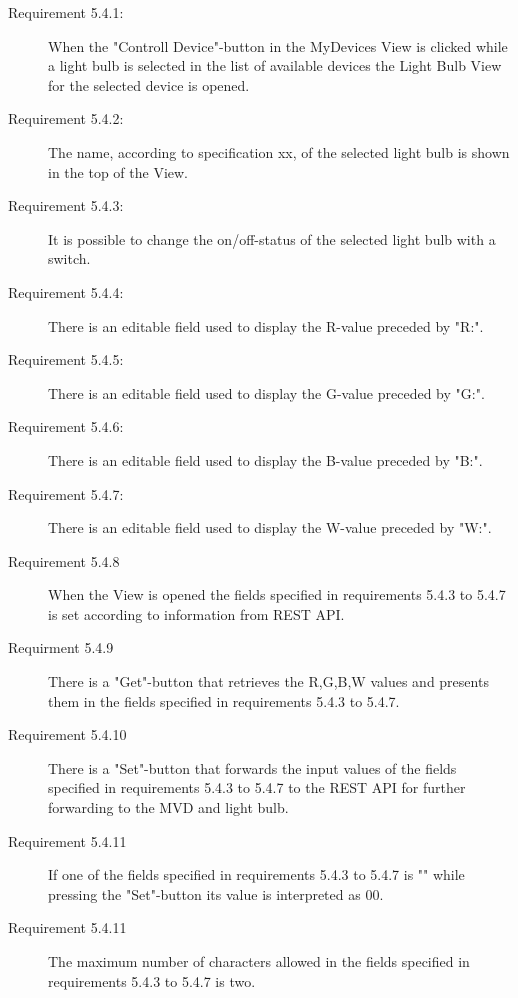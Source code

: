 \documentclass[a4paper]{article}
\begin{document}
\begin{description}
\item[Requirement 5.4.1:] When the "Controll Device"-button in the MyDevices View is clicked while a light bulb is selected in the list of available devices the Light Bulb View for the selected device is opened. 

\item[Requirement 5.4.2:] The name, according to specification xx, of the selected light bulb is shown in the top of the View.

\item[Requirement 5.4.3:] It is possible to change the on/off-status of the selected light bulb with a switch.

\item[Requirement 5.4.4:] There is an editable field used to display the R-value preceded by "R:".

\item[Requirement 5.4.5:] There is an editable field used to display the G-value preceded by "G:".

\item[Requirement 5.4.6:] There is an editable field used to display the B-value preceded by "B:".

\item[Requirement 5.4.7:] There is an editable field used to display the W-value preceded by "W:".

\item[Requirement 5.4.8] When the View is opened the fields specified in requirements 5.4.3 to 5.4.7 is set according to information from REST API.

\item[Requirment 5.4.9] There is a "Get"-button that retrieves the R,G,B,W values and presents them in the fields specified in requirements 5.4.3 to 5.4.7.

\item[Requirement 5.4.10] There is a "Set"-button that forwards the input values of the fields specified in requirements 5.4.3 to 5.4.7 to the REST API for further forwarding to the MVD and light bulb.

\item[Requirement 5.4.11] If one of the fields specified in requirements 5.4.3 to 5.4.7 is "" while pressing the "Set"-button its value is interpreted as 00.

\item[Requirement 5.4.11] The maximum number of characters allowed in the fields specified in requirements 5.4.3 to 5.4.7 is two.


\end{description}
\end{document}
